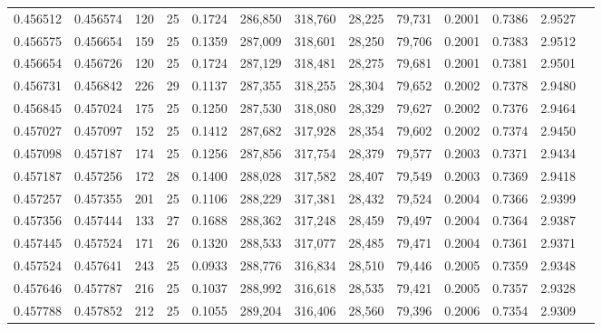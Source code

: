 \begin{tabular}{rrrrrrrrrrrrr}
0.456512 & 0.456574 & 120 &  25 &                                     0.1724 & 286,850 & 318,760 &  28,225 &  79,731 & 0.2001 & 0.7386 & 2.9527 \\
0.456575 & 0.456654 & 159 &  25 &                                     0.1359 & 287,009 & 318,601 &  28,250 &  79,706 & 0.2001 & 0.7383 & 2.9512 \\
0.456654 & 0.456726 & 120 &  25 &                                     0.1724 & 287,129 & 318,481 &  28,275 &  79,681 & 0.2001 & 0.7381 & 2.9501 \\
0.456731 & 0.456842 & 226 &  29 &                                     0.1137 & 287,355 & 318,255 &  28,304 &  79,652 & 0.2002 & 0.7378 & 2.9480 \\
0.456845 & 0.457024 & 175 &  25 &                                     0.1250 & 287,530 & 318,080 &  28,329 &  79,627 & 0.2002 & 0.7376 & 2.9464 \\
0.457027 & 0.457097 & 152 &  25 &                                     0.1412 & 287,682 & 317,928 &  28,354 &  79,602 & 0.2002 & 0.7374 & 2.9450 \\
0.457098 & 0.457187 & 174 &  25 &                                     0.1256 & 287,856 & 317,754 &  28,379 &  79,577 & 0.2003 & 0.7371 & 2.9434 \\
0.457187 & 0.457256 & 172 &  28 &                                     0.1400 & 288,028 & 317,582 &  28,407 &  79,549 & 0.2003 & 0.7369 & 2.9418 \\
0.457257 & 0.457355 & 201 &  25 &                                     0.1106 & 288,229 & 317,381 &  28,432 &  79,524 & 0.2004 & 0.7366 & 2.9399 \\
0.457356 & 0.457444 & 133 &  27 &                                     0.1688 & 288,362 & 317,248 &  28,459 &  79,497 & 0.2004 & 0.7364 & 2.9387 \\
0.457445 & 0.457524 & 171 &  26 &                                     0.1320 & 288,533 & 317,077 &  28,485 &  79,471 & 0.2004 & 0.7361 & 2.9371 \\
0.457524 & 0.457641 & 243 &  25 &                                     0.0933 & 288,776 & 316,834 &  28,510 &  79,446 & 0.2005 & 0.7359 & 2.9348 \\
0.457646 & 0.457787 & 216 &  25 &                                     0.1037 & 288,992 & 316,618 &  28,535 &  79,421 & 0.2005 & 0.7357 & 2.9328 \\
0.457788 & 0.457852 & 212 &  25 &                                     0.1055 & 289,204 & 316,406 &  28,560 &  79,396 & 0.2006 & 0.7354 & 2.9309 \\

\end{tabular}
